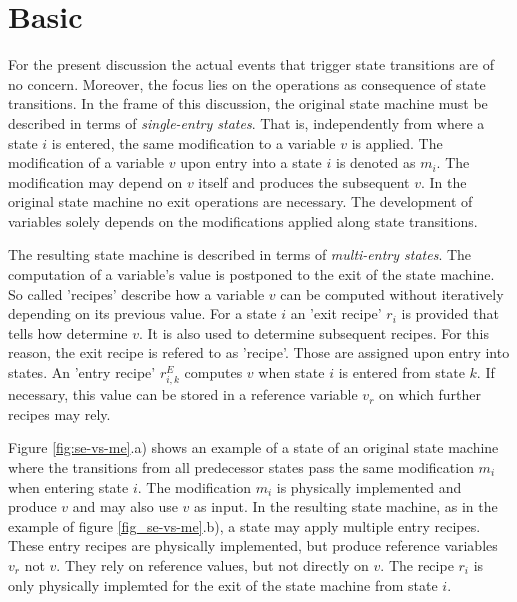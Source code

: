 \documentclass[12pt,a4paper]{scrartcl}
\begin{document}
%
\section{Basic}

For the present discussion the actual events that trigger state transitions are
of no concern. Moreover, the focus lies on the operations as consequence of
state transitions. In the frame of this discussion, the original state machine
must be described in terms of \textit{single-entry states}. That is,
independently from where a state $i$ is entered, the same modification to a
variable $v$ is applied. The modification of a variable $v$ upon entry into a
state $i$ is denoted as $m_i$. The modification may depend on $v$ itself and
produces the subsequent $v$. In the original state machine no exit operations
are necessary. The development of variables solely depends on the modifications
applied along state transitions. 

The resulting state machine is described in terms of \textit{multi-entry
states}. The computation of a variable's value is postponed to the exit of the
state machine. So called 'recipes' describe how a variable $v$ can be computed
without iteratively depending on its previous value.  For a state $i$ an 'exit
recipe' $r_i$ is provided that tells how determine $v$.  It is also used to
determine subsequent recipes. For this reason, the exit recipe is refered to as
'recipe'.  Those are assigned upon entry into states.  An 'entry recipe'
$r^E_{i,k}$ computes $v$ when state $i$ is entered from state $k$.  If
necessary, this value can be stored in a reference variable $v_r$ on which
further recipes may rely.

Figure \ref{fig:se-vs-me}.a) shows an example of a state of an original state
machine where the transitions from all predecessor states pass the same
modification $m_i$ when entering state $i$. The modification $m_i$ is physically
implemented and produce $v$ and may also use $v$ as input. In the resulting
state machine, as in the example of figure \ref{fig_se-vs-me}.b), a state may
apply multiple entry recipes. These entry recipes are physically implemented,
but produce reference variables $v_r$ not $v$.  They rely on reference values,
but not directly on $v$. The recipe $r_i$ is only physically implemted for the
exit of the state machine from state $i$.  
\end{document}
